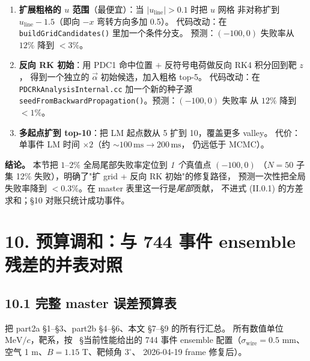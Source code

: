 \begin{enumerate}
  \item \textbf{扩展粗格的 $u$ 范围}（最便宜）：当 $|u_\mathrm{line}|>0.1$ 时把 $u$ 网格
        非对称扩到 $u_\mathrm{line} - 1.5$（即向 $-x$ 弯转方向多加 0.5）。
        代码改动：在 \texttt{buildGridCandidates()} 里加一个条件分支。
        预测：$(-100, 0)$ 失败率从 $12\%$ 降到 $<3\%$。
  \item \textbf{反向 RK 初始}：用 PDC1 命中位置 $+$ 反符号电荷做反向 RK4 积分回到靶 $z$，
        得到一个独立的 $\vec\alpha$ 初始候选，加入粗格 top-5。
        代码改动：在 \texttt{PDCRkAnalysisInternal.cc} 加一个新的种子源
        \texttt{seedFromBackwardPropagation()}。预测：$(-100, 0)$ 失败率
        从 $12\%$ 降到 $<1\%$。
  \item \textbf{多起点扩到 top-10}：把 LM 起点数从 5 扩到 10，覆盖更多 valley。
        代价：单事件 LM 时间 $\times 2$（约 $\sim 100\,\mathrm{ms} \to 200\,\mathrm{ms}$，
        仍远低于 MCMC）。
\end{enumerate}

\textbf{结论。} 本节把 $1$--$2\%$ 全局尾部失败率定位到 \emph{1 个}真值点 $(-100, 0)$
（$N=50$ 子集 12\% 失败），明确了"扩 grid + 反向 RK 初始"的修复路径，
预测一次性把全局失败率降到 $<0.3\%$。在 master 表里这一行是\emph{尾部}贡献，
不进式 (II.0.1) 的方差求和；§10 对账只统计成功事件。

\section{10. 预算调和：与 744 事件 ensemble 残差的并表对照}
\label{sec:partIIc:budget:reconciliation}
\label{sec:budget-master}

\subsection*{10.1 完整 master 误差预算表}

把 part2a §1--§3、part2b §4--§6、本文 §7--§9 的所有行汇总。
所有数值单位 $\mathrm{MeV}/c$，靶系，按 \StatusReport{}~§当前性能给出的 744 事件
ensemble 配置（$\sigma_\mathrm{wire}=0.5$ mm、空气 1 m、$B=1.15$ T、靶倾角 $3^\circ$、
2026-04-19 frame 修复后）。

